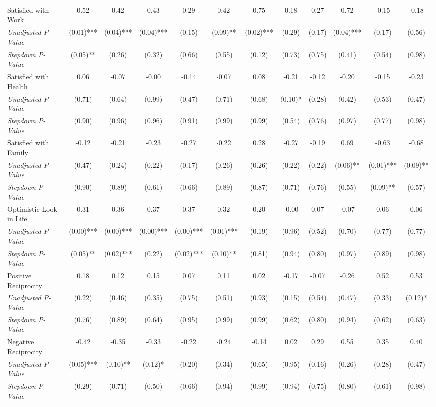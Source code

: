 \begin{tabular}{l c c c c c c c c c c c}
Satisfied with Work & 0.52 & 0.42 & 0.43 & 0.29 & 0.42 & 0.75 & 0.18 & 0.27 & 0.72 & -0.15 & -0.18 \\
\quad \textit{Unadjusted P-Value} & (0.01)*** & (0.04)*** & (0.04)*** & (0.15) & (0.09)** & (0.02)*** & (0.29) & (0.17) & (0.04)*** & (0.17) & (0.56) \\
\quad \textit{Stepdown P-Value} & (0.05)** & (0.26) & (0.32) & (0.66) & (0.55) & (0.12) & (0.73) & (0.75) & (0.41) & (0.54) & (0.98) \\
Satisfied with Health & 0.06 & -0.07 & -0.00 & -0.14 & -0.07 & 0.08 & -0.21 & -0.12 & -0.20 & -0.15 & -0.23 \\
\quad \textit{Unadjusted P-Value} & (0.71) & (0.64) & (0.99) & (0.47) & (0.71) & (0.68) & (0.10)* & (0.28) & (0.42) & (0.53) & (0.47) \\
\quad \textit{Stepdown P-Value} & (0.90) & (0.96) & (0.96) & (0.91) & (0.99) & (0.99) & (0.54) & (0.76) & (0.97) & (0.77) & (0.98) \\
Satisfied with Family & -0.12 & -0.21 & -0.23 & -0.27 & -0.22 & 0.28 & -0.27 & -0.19 & 0.69 & -0.63 & -0.68 \\
\quad \textit{Unadjusted P-Value} & (0.47) & (0.24) & (0.22) & (0.17) & (0.26) & (0.26) & (0.22) & (0.22) & (0.06)** & (0.01)*** & (0.09)** \\
\quad \textit{Stepdown P-Value} & (0.90) & (0.89) & (0.61) & (0.66) & (0.89) & (0.87) & (0.71) & (0.76) & (0.55) & (0.09)** & (0.57) \\
Optimistic Look in Life & 0.31 & 0.36 & 0.37 & 0.37 & 0.32 & 0.20 & -0.00 & 0.07 & -0.07 & 0.06 & 0.06 \\
\quad \textit{Unadjusted P-Value} & (0.00)*** & (0.00)*** & (0.00)*** & (0.00)*** & (0.01)*** & (0.19) & (0.96) & (0.52) & (0.70) & (0.77) & (0.77) \\
\quad \textit{Stepdown P-Value} & (0.05)** & (0.02)*** & (0.22) & (0.02)*** & (0.10)** & (0.81) & (0.94) & (0.80) & (0.97) & (0.89) & (0.98) \\
Positive Reciprocity & 0.18 & 0.12 & 0.15 & 0.07 & 0.11 & 0.02 & -0.17 & -0.07 & -0.26 & 0.52 & 0.53 \\
\quad \textit{Unadjusted P-Value} & (0.22) & (0.46) & (0.35) & (0.75) & (0.51) & (0.93) & (0.15) & (0.54) & (0.47) & (0.33) & (0.12)* \\
\quad \textit{Stepdown P-Value} & (0.76) & (0.89) & (0.64) & (0.95) & (0.99) & (0.99) & (0.62) & (0.80) & (0.94) & (0.62) & (0.63) \\
Negative Reciprocity & -0.42 & -0.35 & -0.33 & -0.22 & -0.24 & -0.14 & 0.02 & 0.29 & 0.55 & 0.35 & 0.40 \\
\quad \textit{Unadjusted P-Value} & (0.05)*** & (0.10)** & (0.12)* & (0.20) & (0.34) & (0.65) & (0.95) & (0.16) & (0.26) & (0.28) & (0.47) \\
\quad \textit{Stepdown P-Value} & (0.29) & (0.71) & (0.50) & (0.66) & (0.94) & (0.99) & (0.94) & (0.75) & (0.80) & (0.61) & (0.98) \\
\bottomrule
\end{tabular}
